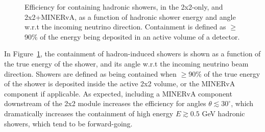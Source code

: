 \begin{figure}[htb]
  \centering
  \caption{Efficiency for containing hadronic showers, in the 2x2-only, and 2x2+MINERvA, as a function of hadronic shower energy and angle w.r.t the incoming neutrino direction. Containment is defined as $\geq$90\% of the energy being deposited in an active volume of a detector.}
  \label{fig:hadronic_containment}
\end{figure}
In Figure~\ref{fig:hadronic_containment}, the containment of hadron-induced showers is shown as a function of the true energy of the shower, and its angle w.r.t the incoming neutrino beam direction. Showers are defined as being contained when $\geq$90\% of the true energy of the shower is deposited inside the active 2x2 volume, or the MINERvA component if applicable. As expected, including a MINERvA component downstream of the 2x2 module increases the efficiency for angles $\theta \lesssim 30^{\circ}$, which dramatically increases the containment of high energy $E \gtrsim 0.5$ GeV hadronic showers, which tend to be forward-going.

